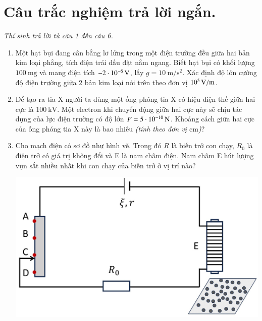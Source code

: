 \section{Câu trắc nghiệm trả lời ngắn.} \textit{Thí sinh trả lời từ câu 1 đến câu 6.}
\begin{enumerate}[label=\bfseries Câu \arabic*:]
	\item Một hạt bụi đang cân bằng lơ lửng trong một điện trường đều giữa hai bản kim loại phẳng, tích điện trái dấu đặt nằm ngang. Biết hạt bụi có khối lượng $\SI{100}{\milli\gram}$ và mang điện tích $\SI{-2E-6}{\volt}$, lấy $g=\SI{10}{\meter/\second^2}$. Xác định độ lớn cường độ điện trường giữa 2 bản kim loại nói trên theo đơn vị $\SI{E5}{\volt/\meter}$.

\item Để tạo ra tia X người ta dùng một ống phóng tia X có hiệu điện thế giữa hai cực là $\SI{100}{\kilo\volt}$. Một electron khi chuyển động giữa hai cực này sẽ chịu tác dụng của lực điện trường có độ lớn $F=\SI{5E-10}{\newton}$. Khoảng cách giữa hai cực của ống phóng tia X này là bao nhiêu \textit{(tính theo đơn vị $\si{\centi\meter}$)}?

\item Cho mạch điện có sơ đồ như hình vẽ. Trong đó $R$ là biến trở con chạy, $R_0$ là điện trở có giá trị không đổi và E là nam châm điện. Nam châm E hút lượng vụn sắt nhiều nhất khi con chạy của biến trở ở vị trí nào?
\begin{center}
	\includegraphics[width=0.6\linewidth]{../figs/PH11-FinalSem2-02-6}
\end{center}


\end{enumerate}
